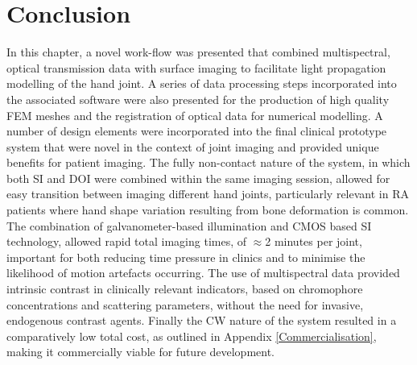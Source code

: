 \documentclass[twoside]{bhamthesis}
\theoremstyle{definition}
\begin{document}
\begin{comment}
A breakdown of typical times for the different stages of computational processing are shown in Table \ref{tab:Processing_time}.

The largest allocations of memory were from construction of the high density forward mesh and the spectrally constrained Jacobian, which required $/approx$? and $/approx$? of RAM respectively.

\bgroup
\def\arraystretch{1.2}
\begin{table}[!ht]
\small
\begin{center}
 \begin{tabular}{c| c c c c c} 
  & SI Processing & FEM Mesh & Inverse Basis &  DOT Image & Total \\ 
  &  & Generation & Generation & Reconstruction &  \\ 

 \hline
Time (s) &  $\pm$   &  123.4 $\pm$ 5.2 &  $\pm$ &  $\pm$ &  $\pm$  \\  
\end{tabular}
\caption{Time taken for each section of data processing and image reconstruction (mean $\pm$ S.D.) for 10 example joints from 10 patients in the final clinical study.}
\label{tab:Processing_time}
\end{center}
\end{table}
\egroup
\end{comment}

\section{Conclusion}

In this chapter, a novel work-flow was presented that combined multispectral, optical transmission data with surface imaging to facilitate light propagation modelling of the hand joint. A series of data processing steps incorporated into the associated software were also presented for the production of high quality FEM meshes and the registration of optical data for numerical modelling. A number of design elements were incorporated into the final clinical prototype system that were novel in the context of joint imaging and provided unique benefits for patient imaging. The fully non-contact nature of the system, in which both SI and DOI were combined within the same imaging session, allowed for easy transition between imaging different hand joints, particularly relevant in RA patients where hand shape variation resulting from bone deformation is common. The combination of galvanometer-based illumination and CMOS based SI technology, allowed rapid total imaging times, of $\approx$2 minutes per joint, important for both reducing time pressure in clinics and to minimise the likelihood of motion artefacts occurring. The use of multispectral data provided intrinsic contrast in clinically relevant indicators, based on chromophore concentrations and scattering parameters, without the need for invasive, endogenous contrast agents. Finally the CW nature of the system resulted in a comparatively low total cost, as outlined in Appendix \ref{Commercialisation}, making it commercially viable for future development. 
\end{document}
